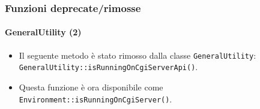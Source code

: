 
\begin{frame}[fragile]
	\frametitle{Funzioni deprecate/rimosse}
	\framesubtitle{GeneralUtility (2)}

	\begin{itemize}
		\item Il seguente metodo è stato rimosso dalla classe \texttt{GeneralUtility}:
			\texttt{GeneralUtility::isRunningOnCgiServerApi()}.
		\item Questa funzione è ora disponibile come\newline
			\texttt{Environment::isRunningOnCgiServer()}.

	\end{itemize}

\end{frame}


